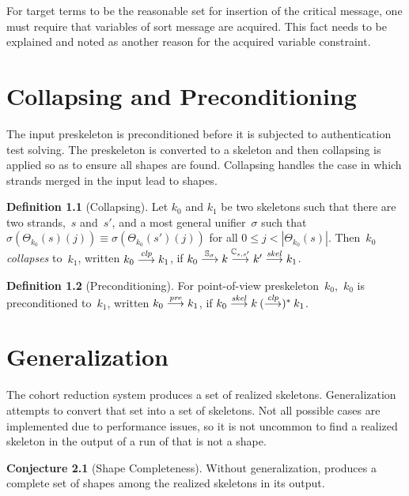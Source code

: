 \documentclass[12pt]{report}
\theoremstyle{definition}
\newtheorem{defn}{Definition}[chapter]
\newtheorem{conj}[thm]{Conjecture}
\newenvironment{note}{\itshape\par}{}
\begin{document}
\begin{note}
For target terms to be the reasonable set for insertion of the
critical message, one must require that variables of sort message are
acquired.  This fact needs to be explained and noted as another reason
for the acquired variable constraint.
\end{note}

\chapter{Collapsing and Preconditioning}\label{chp:collapsing}

The input preskeleton is preconditioned before it is subjected to
authentication test solving.  The preskeleton is converted to a
skeleton and then collapsing is applied so as to ensure all shapes are
found.  Collapsing handles the case in which strands merged in the
input lead to shapes.

\begin{defn}[Collapsing]
Let $k_0$ and $k_1$ be two skeletons such that there are two
strands,~$s$ and~$s'$, and a most general unifier~$\sigma$ such that
$\sigma(\Theta_{k_0}(s)(j))\equiv \sigma(\Theta_{k_0}(s')(j))$ for all
$0\leq j<|\Theta_{k_0}(s)|$.  Then~$k_0$ \emph{collapses} to~$k_1$,
written $k_0\stackrel{\operatorname{\mathit{clp}}}{\longrightarrow}k_1$, if
$k_0\stackrel{\mathbb S_\sigma}{\longrightarrow}k\stackrel{\mathbb C_{s,s'}}{\longrightarrow}k'
\stackrel{\operatorname{\mathit{skel}}}{\longrightarrow}k_1$.
\end{defn}

\begin{defn}[Preconditioning]
For point-of-view preskeleton~$k_0$,~$k_0$ is preconditioned to~$k_1$,
written $k_0\stackrel{\operatorname{\mathit{pre}}}{\longrightarrow}k_1$, if
$k_0\stackrel{\operatorname{\mathit{skel}}}{\longrightarrow}k\mathbin{(\stackrel{\operatorname{\mathit{clp}}}{\longrightarrow})^\ast}k_1$.
\end{defn}

\chapter{Generalization}\label{chp:generalization}

The cohort reduction system produces a set of realized skeletons.
Generalization attempts to convert that set into a set of skeletons.
Not all possible cases are implemented due to performance issues, so
it is not uncommon to find a realized skeleton in the output of a run
of {\cpsa} that is not a shape.

\begin{conj}[Shape Completeness]
Without generalization, {\cpsa} produces a complete set of shapes
among the realized skeletons in its output.
\end{conj}
\end{document}
